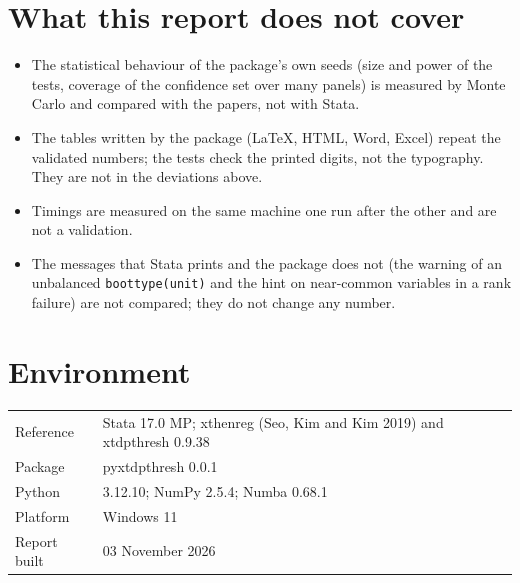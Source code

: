 \documentclass[10.5pt,a4paper]{article}
\newcommand{\code}[1]{\texttt{#1}}
\begin{document}
\section{What this report does not cover}
\begin{itemize}
\item The statistical behaviour of the package's own seeds (size and power of the tests, coverage
of the confidence set over many panels) is measured by Monte Carlo and compared with the papers,
not with Stata.
\item The tables written by the package (LaTeX, HTML, Word, Excel) repeat the validated numbers;
the tests check the printed digits, not the typography. They are not in the deviations above.
\item Timings are measured on the same machine one run after the other and are not a validation.
\item The messages that Stata prints and the package does not (the warning of an unbalanced
\code{boottype(unit)} and the hint on near-common variables in a rank failure) are not compared;
they do not change any number.
\end{itemize}
\section{Environment}
\begin{tabular}{@{}ll@{}}
Reference & Stata 17.0 MP; xthenreg (Seo, Kim and Kim 2019) and xtdpthresh 0.9.38 \\
Package & pyxtdpthresh 0.0.1 \\
Python & 3.12.10; NumPy 2.5.4; Numba 0.68.1 \\
Platform & Windows 11 \\
Report built & 03 November 2026 \\
\end{tabular}
\end{document}
